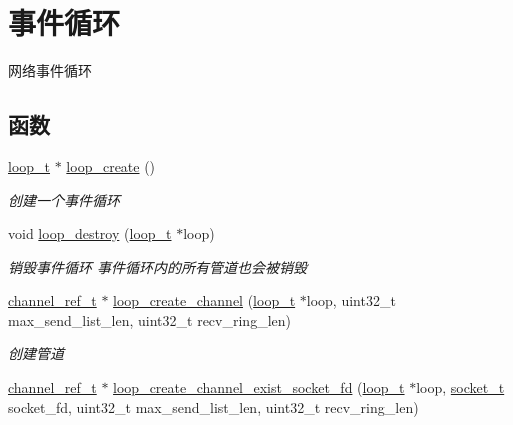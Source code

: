 \hypertarget{a00105}{}\section{事件循环}
\label{a00105}


网络事件循环  


\subsection*{函数}
\begin{DoxyCompactItemize}
\item 
\hyperlink{a00051_a9c3ad1cd2de83e09f3a7b59fa82c94ee_a9c3ad1cd2de83e09f3a7b59fa82c94ee}{loop\+\_\+t} $\ast$ \hyperlink{a00105_ga878bf0cd280e0bd183144bb95ca4a7b1_ga878bf0cd280e0bd183144bb95ca4a7b1}{loop\+\_\+create} ()
\begin{DoxyCompactList}\small\item\em 创建一个事件循环 \end{DoxyCompactList}\item 
void \hyperlink{a00105_ga921fd5e5e16a73de123e81baab187a0a_ga921fd5e5e16a73de123e81baab187a0a}{loop\+\_\+destroy} (\hyperlink{a00051_a9c3ad1cd2de83e09f3a7b59fa82c94ee_a9c3ad1cd2de83e09f3a7b59fa82c94ee}{loop\+\_\+t} $\ast$loop)
\begin{DoxyCompactList}\small\item\em 销毁事件循环 事件循环内的所有管道也会被销毁 \end{DoxyCompactList}\item 
\hyperlink{a00051_a151271c9d188ef28d4d24bb81dcc1263_a151271c9d188ef28d4d24bb81dcc1263}{channel\+\_\+ref\+\_\+t} $\ast$ \hyperlink{a00105_gab5b73ea9a0347b431f93ebf30ecd05b5_gab5b73ea9a0347b431f93ebf30ecd05b5}{loop\+\_\+create\+\_\+channel} (\hyperlink{a00051_a9c3ad1cd2de83e09f3a7b59fa82c94ee_a9c3ad1cd2de83e09f3a7b59fa82c94ee}{loop\+\_\+t} $\ast$loop, uint32\+\_\+t max\+\_\+send\+\_\+list\+\_\+len, uint32\+\_\+t recv\+\_\+ring\+\_\+len)
\begin{DoxyCompactList}\small\item\em 创建管道 \end{DoxyCompactList}\item 
\hyperlink{a00051_a151271c9d188ef28d4d24bb81dcc1263_a151271c9d188ef28d4d24bb81dcc1263}{channel\+\_\+ref\+\_\+t} $\ast$ \hyperlink{a00105_ga6879ac453ef83768ce8f8ef43a474409_ga6879ac453ef83768ce8f8ef43a474409}{loop\+\_\+create\+\_\+channel\+\_\+exist\+\_\+socket\+\_\+fd} (\hyperlink{a00051_a9c3ad1cd2de83e09f3a7b59fa82c94ee_a9c3ad1cd2de83e09f3a7b59fa82c94ee}{loop\+\_\+t} $\ast$loop, \hyperlink{a00051_a0d9e0afbf02fb6ed6c5b1415dce51b05_a0d9e0afbf02fb6ed6c5b1415dce51b05}{socket\+\_\+t} socket\+\_\+fd, uint32\+\_\+t max\+\_\+send\+\_\+list\+\_\+len, uint32\+\_\+t recv\+\_\+ring\+\_\+len)

\end{DoxyCompactItemize}
